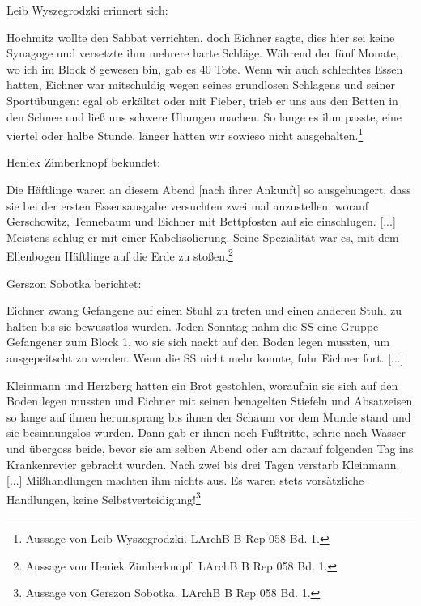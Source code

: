\documentclass[a4paper,12pt,ngerman,
]{nisebook}
\begin{document}
Leib Wyszegrodzki erinnert sich:
\begin{leftbar}
 Hochmitz wollte den Sabbat verrichten, doch Eichner sagte, dies hier sei keine Synagoge und versetzte ihm mehrere harte Schläge. Während der fünf Monate, wo ich im Block 8 gewesen bin, gab es 40 Tote. Wenn wir auch schlechtes Essen hatten, Eichner war mitschuldig wegen seines grundlosen Schlagens und seiner Sportübungen: egal ob erkältet oder mit Fieber, trieb er uns aus den Betten in den Schnee und ließ uns schwere Übungen machen. So lange es ihm passte, eine viertel oder halbe Stunde, länger hätten wir sowieso nicht ausgehalten.\footnote{Aussage von Leib Wyszegrodzki. LArchB B Rep 058 Bd. 1.}
\end{leftbar}


Heniek Zimberknopf bekundet:
\begin{leftbar}
Die Häftlinge waren an diesem Abend [nach ihrer Ankunft] so ausgehungert, dass sie bei der ersten Essensausgabe versuchten zwei mal anzustellen, worauf Gerschowitz, Tennebaum und Eichner mit Bettpfosten auf sie einschlugen. [...] Meistens schlug er mit einer Kabelisolierung. Seine Spezialität war es, mit dem Ellenbogen Häftlinge auf die Erde zu stoßen.\footnote{Aussage von Heniek Zimberknopf. LArchB B Rep 058 Bd. 1.}
\end{leftbar}

Gerszon Sobotka berichtet:
\begin{leftbar}
Eichner zwang Gefangene auf einen Stuhl zu treten und einen anderen Stuhl zu halten bis sie bewusstlos wurden. Jeden Sonntag nahm die SS eine Gruppe Gefangener zum Block 1, wo sie sich nackt auf den Boden legen mussten, um ausgepeitscht zu werden. Wenn die SS nicht mehr konnte, fuhr Eichner fort. [...]

Kleinmann und Herzberg hatten ein Brot gestohlen, woraufhin sie sich auf den Boden legen mussten und Eichner mit seinen benagelten Stiefeln und Absatzeisen so lange auf ihnen herumsprang bis ihnen der Schaum vor dem Munde stand und sie besinnungslos wurden. Dann gab er ihnen noch Fußtritte, schrie nach Wasser und übergoss beide, bevor sie am selben Abend oder am darauf folgenden Tag ins Krankenrevier gebracht wurden. Nach zwei bis drei Tagen verstarb Kleinmann. [...] \newline
Mißhandlungen machten ihm nichts aus. Es waren stets vorsätzliche Handlungen, keine Selbstverteidigung!\footnote{Aussage von Gerszon Sobotka. LArchB B Rep 058 Bd. 1.}
\end{leftbar}
\end{document}
